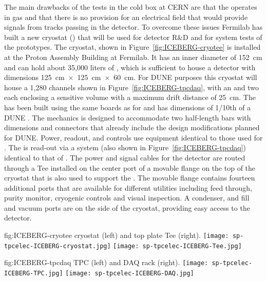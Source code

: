 The main drawbacks of the tests in the cold box at CERN are that the 
operates in gas and that there is no provision for an electrical field that 
would provide signals from tracks passing in the detector. To overcome these 
issues Fermilab has built a new cryostat () that will be used for 
 detector R\&D and for system tests of the  prototypes. 
The  cryostat, shown in Figure~\ref{fig:ICEBERG-cryotee} is installed
at the Proton Assembly Building at Fermilab. It has an inner diameter of 152~cm
and can hold about 35,000 liters of , which is sufficient to house a
detector with dimensions 125~cm~$\times$~125~cm~$\times$~60~cm. For DUNE 
purposes this cryostat will house a 1,280 channels  shown in
Figure~\ref{fig:ICEBERG-tpcdaq}, with an  and two  each 
enclosing a sensitive volume with a maximum drift distance of 25~cm. The  
has been built using the same boards as for  and has dimensions of 
1/10th of a DUNE . The  mechanics is designed to accommodate 
two half-length  bars with dimensions and connectors that already 
include the design modifications planned for DUNE. Power, readout, and controls 
use equipment identical to those used for . The  is
read-out via a  system (also shown in Figure~\ref{fig:ICEBERG-tpcdaq})
identical to that of . The power and signal cables for the detector 
are routed through a Tee installed on the center port of a movable flange on the 
top of the cryostat that is also used to support the . The movable 
flange contains fourteen additional ports that are available for different utilities 
including  feed through, purity monitor, cryogenic controls and visual inspection. 
A condenser, and  fill and vacuum ports are on the side of the cryostat, 
providing easy access to the detector.

\begin{dunefigure}
  {fig:ICEBERG-cryotee}
	{ cryostat (left) and top plate Tee (right).}
  \texttt{[image: sp-tpcelec-ICEBERG-cryostat.jpg]}
  \texttt{[image: sp-tpcelec-ICEBERG-Tee.jpg]}
\end{dunefigure}

\begin{dunefigure}
  {fig:ICEBERG-tpcdaq}
	{ TPC (left) and DAQ rack (right).}
  \texttt{[image: sp-tpcelec-ICEBERG-TPC.jpg]}
  \texttt{[image: sp-tpcelec-ICEBERG-DAQ.jpg]}
\end{dunefigure}

